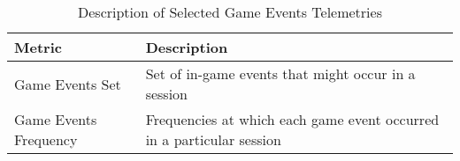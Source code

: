\begin{table}[H] \centering
\caption{Description of Selected Game Events Telemetries}
\label{metricsdescription_event_3}
  \begin{tabularx}{\textwidth}{@{}lX@{}}
    \toprule
    \textbf{Metric}      & \textbf{Description}          \\ \midrule
    {Game Events Set}    & Set of in-game events that might occur in a session  \\
    {Game Events Frequency}     & Frequencies at which each game event occurred in a particular session       \\ 
    \bottomrule
  \end{tabularx}
\end{table}